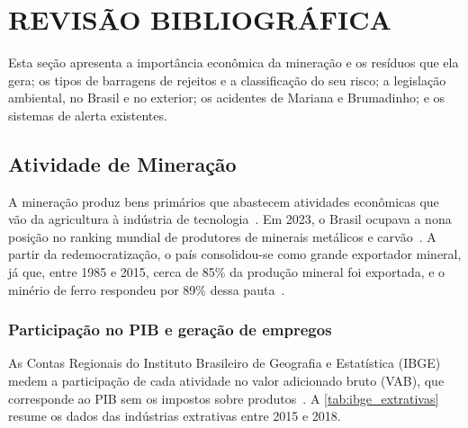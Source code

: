 \chapter{REVISÃO BIBLIOGRÁFICA}
\label{cap1Revisao}

Esta seção apresenta a importância econômica da mineração e os
resíduos que ela gera; os tipos de barragens de rejeitos e a
classificação do seu risco; a legislação ambiental, no Brasil e no
exterior; os acidentes de Mariana e Brumadinho; e os sistemas de alerta
existentes.

\section{Atividade de Mineração}
\label{sec:atividade_mineracao}

A mineração produz bens primários que abastecem atividades econômicas
que vão da agricultura à indústria de tecnologia~\cite{carvalho2012dependencia}. Em 2023, o Brasil ocupava a nona posição
no ranking mundial de produtores de minerais metálicos e carvão~\cite{wpr2024mineral}.
A partir da redemocratização, o país consolidou-se como grande exportador mineral, já que, entre 1985 e 2015, cerca de 85\% da produção mineral
foi exportada, e o minério de ferro respondeu por 89\% dessa pauta~\cite{fernandes2016}.

\subsection{Participação no PIB e geração de empregos}
\label{subsec:papel_mineracao_economia}

As Contas Regionais do Instituto Brasileiro de Geografia e Estatística
(IBGE) medem a participação de cada atividade no valor adicionado bruto
(VAB), que corresponde ao PIB sem os impostos sobre produtos~\cite{ibge2020contasregionais}. A \autoref{tab:ibge_extrativas} resume
os dados das indústrias extrativas entre 2015 e 2018.

